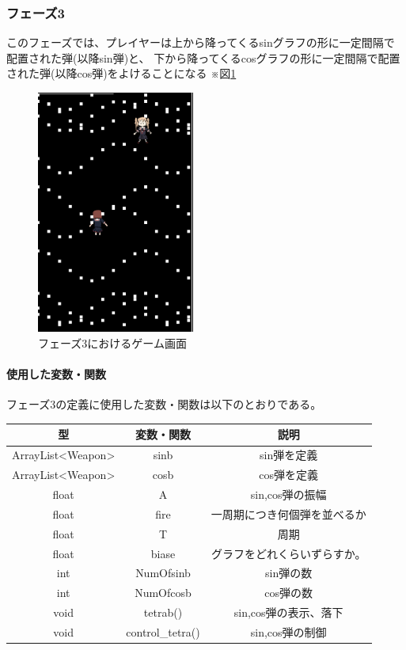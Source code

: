 \documentclass[a4paper,titlepage,11pt]{ltjsarticle}
\begin{document}
\subsubsection{フェーズ3}
このフェーズでは、プレイヤーは上から降ってくるsinグラフの形に一定間隔で配置された弾(以降sin弾)と、
下から降ってくるcosグラフの形に一定間隔で配置された弾(以降cos弾)をよけることになる
※図\ref{phase3}
\begin{figure}[H]
\begin{center}
\includegraphics*[height = 8cm]{phase3_1.png}
\caption{フェーズ3におけるゲーム画面}
\label{phase3}
\end{center}
\end{figure}
\paragraph{使用した変数・関数}
フェーズ3の定義に使用した変数・関数は以下のとおりである。
\begin{table}[H]
	\centering
	\begin{tabular}{|c|c|c|}
		\hline
		型 & 変数・関数 & 説明 \\ \hline \hline
		ArrayList<Weapon> & sinb & sin弾を定義 \\ \hline
		ArrayList<Weapon> & cosb & cos弾を定義 \\ \hline
		float & A & sin,cos弾の振幅 \\ \hline
		float & fire & 一周期につき何個弾を並べるか \\ \hline
		float & T & 周期 \\ \hline
		float & biase & グラフをどれくらいずらすか。 \\ \hline
		int & NumOfsinb & sin弾の数 \\ \hline
		int & NumOfcosb & cos弾の数 \\ \hline
		void & tetrab() & sin,cos弾の表示、落下 \\ \hline
		void & control\_tetra() & sin,cos弾の制御 \\ \hline
	\end{tabular}
\end{table}
\end{document}
